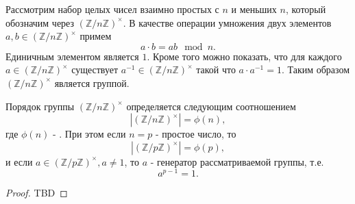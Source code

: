 \begin{definition}
Рассмотрим набор целых чисел взаимно простых с $n$ и меньших $n$,
который обозначим через $\left(\mathbb{Z}/n\mathbb{Z}\right)^\times$. В
качестве операции умножения двух элементов $a,b \in
\left(\mathbb{Z}/n\mathbb{Z}\right)^\times$ примем
\[
a \cdot b = ab \mod n.
\]
Единичным элементом является $1$. Кроме того можно показать, что для
каждого $a \in \left(\mathbb{Z}/n\mathbb{Z}\right)^\times$
существует $a^{-1} \in \left(\mathbb{Z}/n\mathbb{Z}\right)^\times$
такой что $a \cdot a^{-1} = 1$. Таким образом
$\left(\mathbb{Z}/n\mathbb{Z}\right)^\times$ является группой.
\label{def:add:algebra:mult_group}
\end{definition}

\begin{theorem}
Порядок группы $\left(\mathbb{Z}/n\mathbb{Z}\right)^\times$
определяется следующим соотношением
\[
\left|\left(\mathbb{Z}/n\mathbb{Z}\right)^\times\right| = \phi(n),
\]
где $\phi(n)$ - .
При этом если 
$n=p$ - простое число, то
\[
\left|\left(\mathbb{Z}/p\mathbb{Z}\right)^\times\right| = \phi(p),
\]
и если $a \in \left(\mathbb{Z}/p\mathbb{Z}\right)^\times, a \ne 1$,
то $a$ - генератор рассматриваемой группы, т.е.
\[
a^{p-1} = 1.
\]
\begin{proof}
TBD
\end{proof}
\label{thm:add:algebra:cyclic_mult_group}
\end{theorem}

